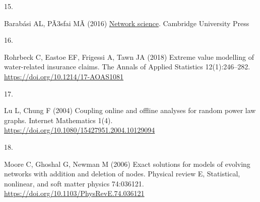\documentclass[
  10pt,
  a4paper,
]{scrreprt}
\newlength{\cslhangindent}
\newlength{\csllabelwidth}
\newlength{\cslentryspacingunit} %
\newenvironment{CSLReferences}[2] %
 {%
  \setlength{\parindent}{0pt}
  \ifodd #1
  \let\oldpar\par
  \def\par{\hangindent=\cslhangindent\oldpar}
  \fi
  \setlength{\parskip}{#2\cslentryspacingunit}
 }%
 {}
\newcommand{\CSLLeftMargin}[1]{\parbox[t]{\csllabelwidth}{#1}}
\newcommand{\CSLRightInline}[1]{\parbox[t]{\linewidth - \csllabelwidth}{#1}\break}
\theoremstyle{plain}
\theoremstyle{definition}
\theoremstyle{plain}
\theoremstyle{remark}
\begin{document}
{\begin{CSLReferences}{0}{0}
\leavevmode{}%
\CSLLeftMargin{15. }%
\CSLRightInline{Barabási AL, PÃ3sfai MÃ (2016)
\href{https://books.google.co.uk/books?id=iLtGDQAAQBAJ}{Network
science}. Cambridge University Press}

\leavevmode{}%
\CSLLeftMargin{16. }%
\CSLRightInline{Rohrbeck C, Eastoe EF, Frigessi A, Tawn JA (2018)
{Extreme value modelling of water-related insurance claims}. The Annals
of Applied Statistics 12(1):246--282.
\url{https://doi.org/10.1214/17-AOAS1081}}

\leavevmode{}%
\CSLLeftMargin{17. }%
\CSLRightInline{Lu L, Chung F (2004) Coupling online and offline
analyses for random power law graphs. Internet Mathematics 1(4).
\url{https://doi.org/10.1080/15427951.2004.10129094}}

\leavevmode{}%
\CSLLeftMargin{18. }%
\CSLRightInline{Moore C, Ghoshal G, Newman M (2006) Exact solutions for
models of evolving networks with addition and deletion of nodes.
Physical review E, Statistical, nonlinear, and soft matter physics
74:036121. \url{https://doi.org/10.1103/PhysRevE.74.036121}}

\end{CSLReferences}
\end{document}
